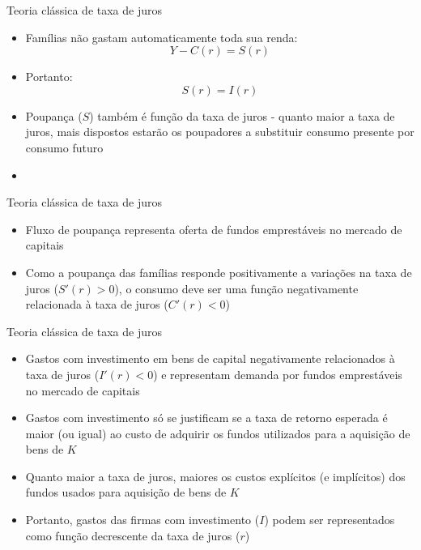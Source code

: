 \documentclass[10pt]{beamer}
\begin{document}
\begin{frame}
    {Teoria clássica de taxa de juros}
    \begin{itemize}
        \item Famílias não gastam automaticamente toda sua renda:
        \begin{equation}
            Y - C(r) = S(r)
            \label{aula3_eq2}
        \end{equation}
        \item Portanto:
        \begin{equation}
            S(r) = I(r)
            \label{aula3_eq3}
        \end{equation}
        \item Poupança ($S$) também é função da taxa de juros - quanto maior a taxa de juros, mais dispostos estarão os poupadores a substituir consumo presente por consumo futuro\bigskip
        \item {}
    \end{itemize}
\end{frame}

\begin{frame}
    {Teoria clássica de taxa de juros}
    \begin{itemize}
        \item Fluxo de poupança representa oferta de fundos emprestáveis no mercado de capitais\bigskip
        \item Como a poupança das famílias responde positivamente a variações na taxa de juros ($S'(r) > 0$), o consumo deve ser uma função negativamente relacionada à taxa de juros ($C'(r) < 0$)
    \end{itemize}
\end{frame}

\begin{frame}
    {Teoria clássica de taxa de juros}
    \begin{itemize}
        \item Gastos com investimento em bens de capital negativamente relacionados à taxa de juros ($I'(r)<0$) e representam demanda por fundos emprestáveis no mercado de capitais\bigskip
        \item Gastos com investimento só se justificam se a taxa de retorno esperada é maior (ou igual) ao custo de adquirir os fundos utilizados para a aquisição de bens de $K$\bigskip
        \item Quanto maior a taxa de juros, maiores os custos explícitos (e implícitos) dos fundos usados para aquisição de bens de $K$\bigskip
        \item Portanto, gastos das firmas com investimento ($I$) podem ser representados como função decrescente da taxa de juros ($r$)
    \end{itemize}
\end{frame}
\end{document}
